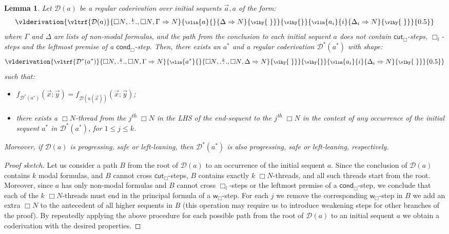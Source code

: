 \documentclass[manuscript,screen]{acmart}
\newtheorem{lem}[thm]{Lemma}
\theoremstyle{definition}
\theoremstyle{remark}
\newcommand{\n}{N}
\newcommand{\sq}{\Box}
\newcommand{\sqn}{{\sq\n}}
\newcommand{\sn}{\sqn}
\newcommand{\cnd}{\mathsf{cond}}
\newcommand{\denot}[1]{f_{#1}}
\newcommand{\seqar}{\Rightarrow}
\newcommand{\der}{\mathcal{D}}
\newcommand{\wk}{\mathsf{w}}
\newcommand{\cut}{\mathsf{cut}}
\newcommand{\boxlef}{\sq_l}
\newcommand{\sql}{\boxlef}
\begin{document}
\begin{lem}\label{lem:to-prove-ncbc-complete-for-nbc}
Let $\der(a)$ be a regular coderivation over initial sequents $\vec a, a$ of the form:
\[
\toks0={0.5}
\vlderivation{
\small
\vltrf{\der(a)}{\sn, \overset{k}{\ldots},\sn, \Gamma  \seqar \n}{\scriptsize \vlin{a}{}{    \Delta \seqar \n}{\vlhy{\ }}}{\vlhy{}}{\scriptsize \vlin{a_i}{i}{ \Delta_i \seqar \n}{\vlhy{\ }}}{\the\toks0}
}
\]
where $\Gamma$ and $\Delta$ are lists of non-modal formulas, and   the path from the conclusion to each initial sequent $a$ does not contain $\cut_\sq$-steps, $\sql$-steps and the leftmost premise of a $\cnd_\sq$-step. 
Then, there exists an $a^*$ and a regular coderivation   $\der^*( a^*)$  with shape:
\[
\toks0={0.5}
\vlderivation{
\small
\vltrf{\der^*( a^*)}{\sn, \overset{k}{\ldots},\sn, \Gamma \seqar \n}{\scriptsize \vlin{a^*}{}{ \sn, \overset{k}{\ldots},\sn,\Delta  \seqar \n}{\vlhy{\ }}}{\vlhy{}}{\scriptsize \vlin{a_i}{i}{  \Delta_i \seqar \n}{\vlhy{\ }}}{\the\toks0}
}
\]
such that:
\begin{itemize}
\item  $\denot{\der^*( a^*)}( \vec x; \vec y)=\denot 
     {\der( a( \vec x))}(\vec x; \vec y) $;
    \item there exists a $\sn$-thread from the $j$\textsuperscript{th} $\sn$ in the LHS of the end-sequent to the $j$\textsuperscript{th} $\sn$ in the context of any occurrence of the initial sequent $a^*$ in $\der^*( a^*)$, for $1\leq j\leq k$.
    \end{itemize}
    Moreover, if $\der(a)$ is progressing, safe or left-leaning, then $\der^*(a^*)$ is also progressing, safe or left-leaning, respectively.
\end{lem}
\begin{proof}[Proof sketch]
Let us consider a path $B$ from the root of $\der( a)$ to an occurrence of the initial sequent $a$. 
Since the conclusion of   $\der( a)$ contains $k$ modal formulas, and $B$ cannot cross $\cut_\sq$-steps, $B$ contains exactly $k$ $\sn$-threads, and all such threads  start from the root. 
Moreover, since $a$ has only non-modal formulas and $B$ cannot cross $\sql$-steps or the leftmost premise of a $\cnd_\sq$-step, we conclude that each of the $k$  $\sn$-threads must end in the principal formula of a $\wk_\sq$-step. 
For each $j$ we remove the corresponding  $\wk_\sq$-step in $B$  we add an extra $\sn$ to the antecedent of all higher sequents in $B$ (this operation may require us to introduce weakening steps for other branches of the proof).  
By repeatedly applying the above procedure for each possible path  from the root of $\der(a)$ to an initial sequent $a$ we obtain a coderivation with the desired properties.
\end{proof}
\end{document}
